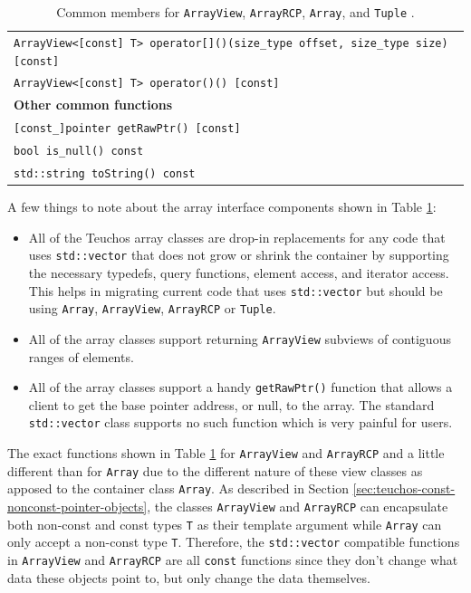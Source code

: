 \documentclass[pdf,ps2pdf,11pt]{SANDreport}
\begin{document}
\begin{table}
{\begin{center}
\begin{tabular}{|l|}
{}\texttt{ArrayView<[const] T> operator[]()(size\_type offset, size\_type size) [const]} \\
{}\texttt{ArrayView<[const] T> operator()() [const]} \\
\hline
{}\textbf{Other common functions} \\
\hline
{}\texttt{[const\_]pointer getRawPtr() [const]} \\
{}\texttt{bool is\_null() const} \\
{}\texttt{std::string toString() const} \\
\hline
\end{tabular}
\caption{\label{tbl:common-array-type-members} Common members for
{}\texttt{ArrayView}, {}\texttt{ArrayRCP}, {}\texttt{Array}, and
{}\texttt{Tuple} .}
\end{center}}
\end{table}

A few things to note about the array interface components shown in
Table {}\ref{tbl:common-array-type-members}:

\begin{itemize}

{}\item{}All of the Teuchos array classes are drop-in replacements for
any code that uses {}\texttt{std::vector} that does not grow or shrink
the container by supporting the necessary typedefs, query functions,
element access, and iterator access.  This helps in migrating current
code that uses {}\texttt{std::vector} but should be using
{}\texttt{Array}, {}\texttt{ArrayView}, {}\texttt{ArrayRCP} or
{}\texttt{Tuple}.

{}\item{}All of the array classes support returning \texttt{ArrayView}
subviews of contiguous ranges of elements.

{}\item{}All of the array classes support a handy
{}\texttt{getRawPtr()} function that allows a client to get the base
pointer address, or null, to the array.  The standard
{}\texttt{std::vector} class supports no such function which is very
painful for users.

\end{itemize}

The exact functions shown in Table
{}\ref{tbl:common-array-type-members} for {}\texttt{ArrayView} and
{}\texttt{ArrayRCP} and a little different than for {}\texttt{Array}
due to the different nature of these view classes as apposed to the
container class {}\texttt{Array}.  As described in Section
{}\ref{sec:teuchos-const-nonconst-pointer-objects}, the classes
{}\texttt{ArrayView} and {}\texttt{ArrayRCP} can encapsulate both
non-const and const types {}\texttt{T} as their template argument
while {}\texttt{Array} can only accept a non-const type {}\texttt{T}.
Therefore, the {}\texttt{std::vector} compatible functions in
{}\texttt{ArrayView} and {}\texttt{ArrayRCP} are all {}\texttt{const}
functions since they don't change what data these objects point to,
but only change the data themselves.
\end{document}
